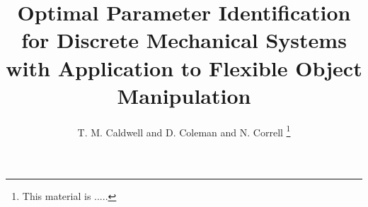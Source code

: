 \documentclass[letterpaper, 10pt, conference]{ieeeconf}
\title{Optimal Parameter Identification for Discrete Mechanical Systems with Application to Flexible Object Manipulation}
\author{T. M. Caldwell and  D. Coleman and N. Correll%
\thanks{
This material is .....}%
}
\begin{document}
\maketitle


\begin{abstract}




\end{abstract}
\end{document}
